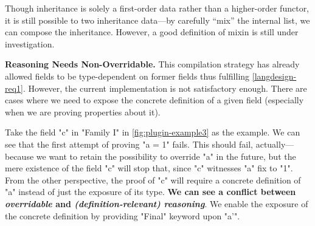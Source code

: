 Though inheritance is solely a first-order data rather
than a higher-order functor, it is still possible to
 two inheritance data---by carefully ``mix'' the internal list, we can compose the inheritance. However, a good definition of mixin is still under investigation.





\textbf{Reasoning Needs Non-Overridable.}
This compilation strategy
has already allowed fields to be type-dependent on former fields thus fulfilling
\ref{langdesign-req1}. However, the current implementation is not satisfactory enough. There are cases where we need to expose
the concrete definition of a given field (especially when we are proving
properties about it).

Take the field "c" in "Family I" in \cref{fig:plugin-example3} as the
example. We can see that the first attempt of proving "a = 1" fails.
This should fail, actually---because we want to retain the possibility
to override "a" in the future, but the mere existence of the field "c"
will stop that, since "c" witnesses "a" fix to "1". From the other
perspective, the proof of "c" will require a concrete definition of "a"
instead of just the exposure of its type. \textbf{We can see a conflict
between \textit{overridable} and \textit{(definition-relevant)
reasoning}}.  We enable the exposure of the concrete definition by
providing "Final" keyword upon "a'".


